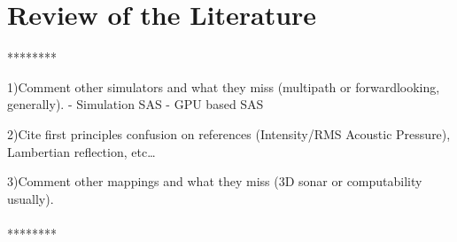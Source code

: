 \section{Review of the Literature}

********

1)Comment other simulators and what they miss (multipath or forwardlooking,
generally).
\citet{Coiras2009} - Simulation SAS
\citet{coiras2009gpu} - GPU based SAS

2)Cite first principles confusion on references (Intensity/RMS Acoustic
Pressure), Lambertian reflection, etc\ldots

3)Comment other mappings and what they miss (3D sonar or computability usually).
\\\\
******** 
